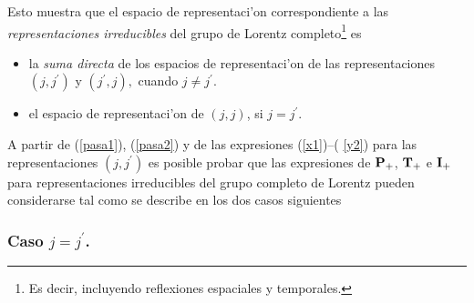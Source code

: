 Esto muestra que el espacio de representaci'on correspondiente a las {\em %
representaciones irreducibles} del grupo de Lorentz completo\footnote{%
Es decir, incluyendo reflexiones espaciales y temporales.} es

\begin{itemize}
\item  la {\em suma directa} de los espacios de representaci'on de las
representaciones $\left( j,j^{\prime }\right) $ y $\left( j^{\prime
},j\right) ,$ cuando $j\neq j^{\prime }$.

\item  el espacio de representaci'on de $\left( j,j\right) $, si $%
j=j^{\prime }$.
\end{itemize}

A partir de (\ref{pasa1}), (\ref{pasa2}) y de las expresiones (\ref{x1})--(%
\ref{y2}) para las representaciones $\left( j,j^{\prime }\right) $ es
posible probar que las expresiones de ${\bf P}_{+}$, ${\bf T}_{+}$ e ${\bf I}%
_{+}$ para representaciones irreducibles del grupo completo de Lorentz
pueden considerarse tal como se describe en los dos casos siguientes \cite
{Gilmore}

\subsubsection{Caso $j=j^{\prime }$.}

